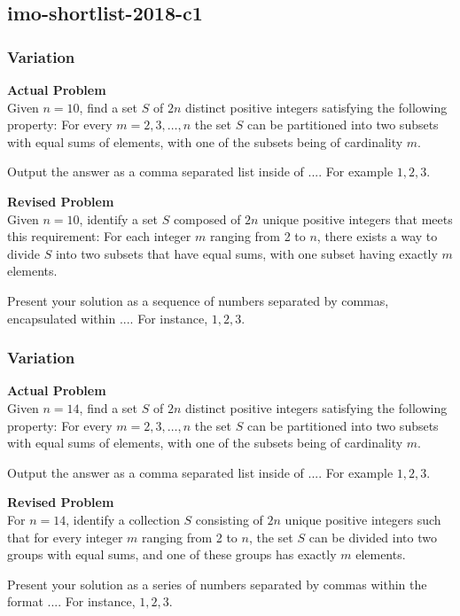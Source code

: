 \subsection{imo-shortlist-2018-c1}
\subsubsection{Variation}
\textbf{Actual Problem}\\
Given $n = 10$, find a set $S$ of $2n$ distinct positive integers
satisfying the following property: For every $m = 2, 3, \ldots, n$ the set $S$ can be partitioned into
two subsets with equal sums of elements, with one of the subsets being of cardinality $m$.

Output the answer as a comma separated list inside of $\boxed{...}$. For example $\boxed{1, 2, 3}$.

\textbf{Revised Problem}\\
Given \( n = 10 \), identify a set \( S \) composed of \( 2n \) unique positive integers that meets this requirement: For each integer \( m \) ranging from 2 to \( n \), there exists a way to divide \( S \) into two subsets that have equal sums, with one subset having exactly \( m \) elements.

Present your solution as a sequence of numbers separated by commas, encapsulated within \(\boxed{...}\). For instance, \(\boxed{1, 2, 3}\).

\subsubsection{Variation}
\textbf{Actual Problem}\\
Given $n = 14$, find a set $S$ of $2n$ distinct positive integers
satisfying the following property: For every $m = 2, 3, \ldots, n$ the set $S$ can be partitioned into
two subsets with equal sums of elements, with one of the subsets being of cardinality $m$.

Output the answer as a comma separated list inside of $\boxed{...}$. For example $\boxed{1, 2, 3}$.

\textbf{Revised Problem}\\
For \(n = 14\), identify a collection \(S\) consisting of \(2n\) unique positive integers such that for every integer \(m\) ranging from 2 to \(n\), the set \(S\) can be divided into two groups with equal sums, and one of these groups has exactly \(m\) elements.

Present your solution as a series of numbers separated by commas within the format $\boxed{...}$. For instance, $\boxed{1, 2, 3}$.

